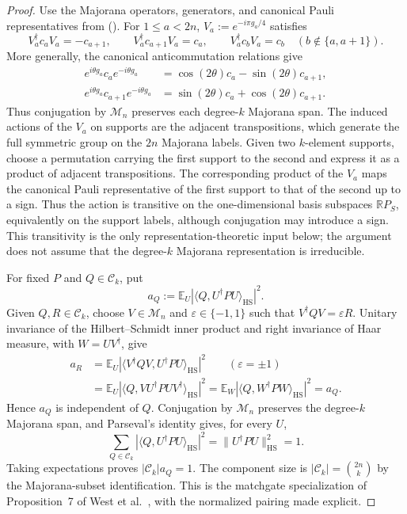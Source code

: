 \documentclass[twoside,10pt]{article}
\numberwithin{equation}{section}
\theoremstyle{slbody}
\theoremstyle{definition}
\theoremstyle{remark}
\newcommand{\E}{\mathbb{E}}
\newcommand{\1}{\mathbf{1}}
\renewcommand{\eqref}[1]{%
  \textup{{\normalfont(\oldstylenums{\ref{#1}}}\normalfont)}}
\begin{document}
\begin{proof}
Use the Majorana operators, generators, and canonical Pauli representatives
from \eqref{eq:majorana-support-convention}.  For $1\leq a<2n$,
$V_a:=e^{-i\pi g_a/4}$ satisfies
\[
 V_a^\dagger c_aV_a=-c_{a+1},\qquad
 V_a^\dagger c_{a+1}V_a=c_a,\qquad
 V_a^\dagger c_bV_a=c_b\quad(b\notin\{a,a+1\}).
\]
More generally, the canonical anticommutation relations give
\begin{align*}
 e^{i\theta g_a}c_ae^{-i\theta g_a}
 &=\cos(2\theta)c_a-\sin(2\theta)c_{a+1},\\
 e^{i\theta g_a}c_{a+1}e^{-i\theta g_a}
 &=\sin(2\theta)c_a+\cos(2\theta)c_{a+1}.
\end{align*}
Thus conjugation by $\mathcal M_n$ preserves each degree-$k$ Majorana span.
The induced actions of the $V_a$ on supports are the adjacent transpositions,
which generate the full symmetric group on the $2n$ Majorana labels.  Given
two $k$-element supports, choose a permutation carrying
the first support to the second and express it as a product of adjacent
transpositions.  The corresponding product of the $V_a$ maps the canonical
Pauli representative of the first support to that of the second up to a sign.
Thus the action is transitive on the one-dimensional basis subspaces
$\mathbb R P_S$, equivalently on the support labels, although conjugation may
introduce a sign.  This transitivity is the only representation-theoretic
input below; the argument does not assume that the degree-$k$ Majorana
representation is irreducible.

For fixed $P$ and $Q\in\mathcal C_k$, put
\[
 a_Q:=\E_U\left|\langle Q,U^\dagger P U\rangle_{\mathrm{HS}}\right|^2.
\]
Given $Q,R\in\mathcal C_k$, choose $V\in\mathcal M_n$ and
$\varepsilon\in\{-1,1\}$ such that $V^\dagger QV=\varepsilon R$.  Unitary
invariance of the Hilbert--Schmidt
inner product and right invariance of Haar measure, with $W=UV^\dagger$,
give
\begin{align*}
 a_R
 &=\E_U\left|\langle V^\dagger QV,U^\dagger P U\rangle_{\mathrm{HS}}\right|^2
   \qquad (\varepsilon=\pm1)\\
 &=\E_U\left|\langle Q,VU^\dagger PUV^\dagger\rangle_{\mathrm{HS}}\right|^2
 =\E_W\left|\langle Q,W^\dagger P W\rangle_{\mathrm{HS}}\right|^2
 =a_Q.
\end{align*}
Hence $a_Q$ is independent of $Q$.  Conjugation by $\mathcal M_n$ preserves
the degree-$k$ Majorana span, and Parseval's identity gives, for every $U$,
\[
 \sum_{Q\in\mathcal C_k}
 \left|\langle Q,U^\dagger P U\rangle_{\mathrm{HS}}\right|^2
 =\|U^\dagger P U\|_{\mathrm{HS}}^2=1.
\]
Taking expectations proves $|\mathcal C_k|a_Q=1$.  The component size is
$|\mathcal C_k|=\binom{2n}{k}$ by the Majorana-subset identification.
This is the matchgate specialization of Proposition~7 of West et
al.~\cite[Proposition~7 and Eq.~(36)]{WestEtAl}, with the normalized pairing
made explicit.
\end{proof}
\end{document}
